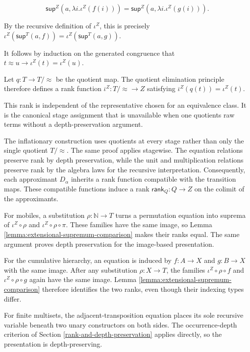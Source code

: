 \documentclass[runningheads]{llncs}
\begin{document}
\[
\mathsf{sup}^Z (a,\lambda i.\iota^Z (f (i)))
=
\mathsf{sup}^Z (a,\lambda i.\iota^Z (g (i))).
\]

By the recursive definition of \(\iota^Z\), this is precisely
\(\iota^Z (\mathsf{sup}^T (a,f)) = \iota^Z (\mathsf{sup}^T (a,g)).\)

It follows by induction on the generated congruence that
\(t\approx u \longrightarrow \iota^Z (t)=\iota^Z (u).\)

Let \(q:T\to T/{\approx}\) be the quotient map. The quotient elimination
principle therefore defines a rank function
\(\overline{\iota}^Z:T/{\approx}\to Z\) satisfying
\(\overline{\iota}^Z (q (t)) = \iota^Z (t).\)

This rank is independent of the representative chosen for an equivalence
class. It is the canonical stage assignment that is unavailable when one
quotients raw terms without a depth-preservation argument.

The inflationary construction uses quotients at every stage rather than
only the single quotient \(T/{\approx}\). The same proof applies
stagewise. The equation relations preserve rank by depth preservation,
while the unit and multiplication relations preserve rank by the algebra
laws for the recursive interpretation. Consequently, each approximant
\(D_\alpha\) inherits a rank function compatible with the transition maps.
These compatible functions induce a rank \(\mathsf{rank}_Q:Q\to Z\) on
the colimit of the approximants.

For mobiles, a substitution \(\rho:\mathbb{N}\to T\) turns a permutation
equation into suprema of \(\iota^Z\circ\rho\) and
\(\iota^Z\circ\rho\circ\pi\). These families have the same image, so
Lemma \ref{lemma:extensional-supremum-comparison} makes their ranks
equal. The same argument proves depth preservation for the image-based
presentation.

For the cumulative hierarchy, an equation is induced by \(f:A\to X\) and
\(g:B\to X\) with the same image. After any substitution
\(\rho:X\to T\), the families \(\iota^Z\circ\rho\circ f\) and
\(\iota^Z\circ\rho\circ g\) again have the same image. Lemma \ref{lemma:extensional-supremum-comparison}
therefore identifies the two ranks, even though their indexing types
differ.

For finite multisets, the adjacent-transposition equation places its
sole recursive variable beneath two unary constructors on both sides.
The occurrence-depth criterion of Section \ref{rank-and-depth-preservation} applies directly, so the
presentation is depth-preserving.
\end{document}
